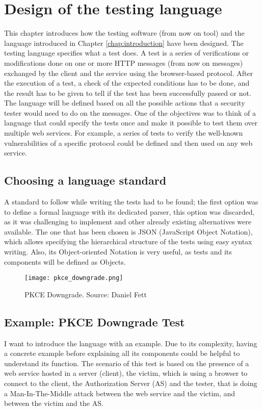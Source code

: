 \chapter{Design of the testing language}
\label{chap:Design}
This chapter introduces how the testing software (from now on tool) and the language introduced in Chapter \ref{chap:introduction} have been designed. The testing language specifies what a test does. A test is a series of verifications or modifications done on one or more HTTP messages (from now on messages) exchanged by the client and the service using the browser-based protocol. After the execution of a test, a check of the expected conditions has to be done, and the result has to be given to tell if the test has been successfully passed or not. The language will be defined based on all the possible actions that a security tester would need to do on the messages. 
One of the objectives was to think of a language that could specify the tests once and make it possible to test them over multiple web services. For example, a series of tests to verify the well-known vulnerabilities of a specific protocol could be defined and then used on any web service.

\section{Choosing a language standard}
A standard to follow while writing the tests had to be found; the first option was to define a formal language with its dedicated parser, this option was discarded, as it was challenging to implement and other already existing alternatives were available. 
The one that has been chosen is JSON (JavaScript Object Notation), which allows specifying the hierarchical structure of the tests using easy syntax writing. Also, its Object-oriented Notation is very useful, as tests and its components will be defined as Objects.

\begin{figure}[h]
    \texttt{[image: pkce\_downgrade.png]}
    \caption{PKCE Downgrade. Source: Daniel Fett \cite{pkce_msc_image}}
    \label{fig:pkce_downgrade}
\end{figure}

\section{Example: PKCE Downgrade Test}
\label{sec:pkce_downgrade}

I want to introduce the language with an example. Due to its complexity, having a concrete example before explaining all its components could be helpful to understand its function.
The scenario of this test is based on the presence of a web service hosted in a server (client), the victim, which is using a browser to connect to the client, the Authorization Server (AS) and the tester, that is doing a Man-In-The-Middle attack between the web service and the victim, and between the victim and the AS.
 
